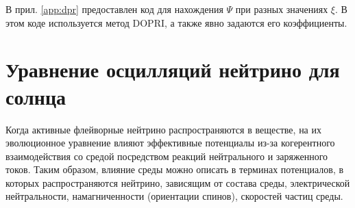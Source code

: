 \documentclass[a4paper,12pt]{article}
\begin{document}
	 В  прил. \ref{app:dpr} предоставлен код для нахождения \(\Psi\) при разных значениях \(\xi\). В этом коде используется метод DOPRI, а также явно задаются его коэффициенты.

	\newpage
	\section{Уравнение осцилляций нейтрино для солнца}
	Когда активные флейворные нейтрино распространяются в веществе, на их
	эволюционное уравнение влияют эффективные потенциалы из-за когерентного
	взаимодействия со средой посредством реакций нейтрального и заряженного
	токов. Таким образом, влияние среды можно описать в терминах потенциалов, в
	которых распространяются нейтрино, зависящим от состава среды, электрической
	нейтральности, намагниченности (ориентации спинов), скоростей частиц среды.
\end{document}
